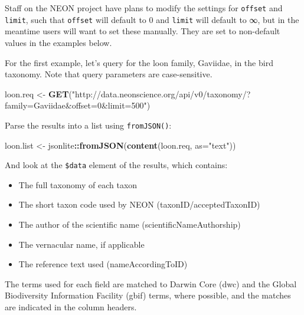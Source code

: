\documentclass[]{book}
\newenvironment{Shaded}{\begin{snugshade}}{\end{snugshade}}
\newcommand{\DataTypeTok}[1]{\textcolor[rgb]{0.13,0.29,0.53}{#1}}
\newcommand{\KeywordTok}[1]{\textcolor[rgb]{0.13,0.29,0.53}{\textbf{#1}}}
\newcommand{\NormalTok}[1]{#1}
\newcommand{\OperatorTok}[1]{\textcolor[rgb]{0.81,0.36,0.00}{\textbf{#1}}}
\newcommand{\StringTok}[1]{\textcolor[rgb]{0.31,0.60,0.02}{#1}}
\providecommand{\tightlist}{%
  \setlength{\itemsep}{0pt}\setlength{\parskip}{0pt}}
\begin{document}
Staff on the NEON project have plans to modify the settings for \texttt{offset}
and \texttt{limit}, such that \texttt{offset} will default to 0 and \texttt{limit} will default
to ∞, but in the meantime users will want to set these manually. They are
set to non-default values in the examples below.

For the first example, let's query for the loon family, Gaviidae, in the
bird taxonomy. Note that query parameters are case-sensitive.

\begin{Shaded}
\begin{Highlighting}[]
\NormalTok{loon.req <-}\StringTok{ }\KeywordTok{GET}\NormalTok{(}\StringTok{"http://data.neonscience.org/api/v0/taxonomy/?family=Gaviidae&offset=0&limit=500"}\NormalTok{)}
\end{Highlighting}
\end{Shaded}

Parse the results into a list using \texttt{fromJSON()}:

\begin{Shaded}
\begin{Highlighting}[]
\NormalTok{loon.list <-}\StringTok{ }\NormalTok{jsonlite}\OperatorTok{::}\KeywordTok{fromJSON}\NormalTok{(}\KeywordTok{content}\NormalTok{(loon.req, }\DataTypeTok{as=}\StringTok{"text"}\NormalTok{))}
\end{Highlighting}
\end{Shaded}

And look at the \texttt{\$data} element of the results, which contains:

\begin{itemize}
\tightlist
\item
  The full taxonomy of each taxon
\item
  The short taxon code used by NEON (taxonID/acceptedTaxonID)
\item
  The author of the scientific name (scientificNameAuthorship)
\item
  The vernacular name, if applicable
\item
  The reference text used (nameAccordingToID)
\end{itemize}

The terms used for each field are matched to Darwin Core (dwc) and
the Global Biodiversity Information Facility (gbif) terms, where
possible, and the matches are indicated in the column headers.

\begin{Shaded}
\end{Shaded}
\end{document}
